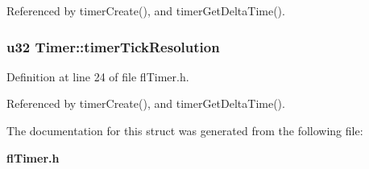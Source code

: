 Referenced by timer\-Create(), and timer\-Get\-Delta\-Time().
\subsubsection{\setlength{\rightskip}{0pt plus 5cm}u32 {\bf Timer::timer\-Tick\-Resolution}}\label{structTimer_cc4b8c959f959cbb8804210ef24fe3c4}




Definition at line 24 of file fl\-Timer.h.

Referenced by timer\-Create(), and timer\-Get\-Delta\-Time().

The documentation for this struct was generated from the following file:\begin{CompactItemize}
\item 
{\bf fl\-Timer.h}\end{CompactItemize}
